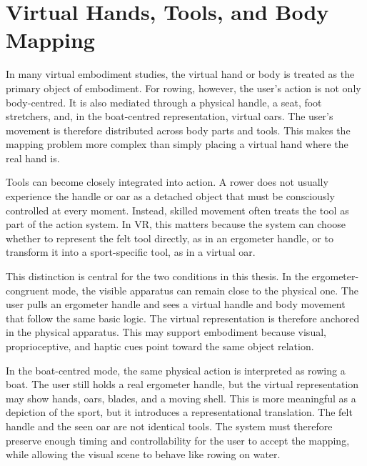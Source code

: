 \section{Virtual Hands, Tools, and Body Mapping}
\label{sec:background_virtual_hands_tools_body_mapping}

In many virtual embodiment studies, the virtual hand or body is treated as the primary object of embodiment. For rowing, however, the user's action is not only body-centred. It is also mediated through a physical handle, a seat, foot stretchers, and, in the boat-centred representation, virtual oars. The user's movement is therefore distributed across body parts and tools. This makes the mapping problem more complex than simply placing a virtual hand where the real hand is.

Tools can become closely integrated into action. A rower does not usually experience the handle or oar as a detached object that must be consciously controlled at every moment. Instead, skilled movement often treats the tool as part of the action system. In VR, this matters because the system can choose whether to represent the felt tool directly, as in an ergometer handle, or to transform it into a sport-specific tool, as in a virtual oar.

This distinction is central for the two conditions in this thesis. In the ergometer-congruent mode, the visible apparatus can remain close to the physical one. The user pulls an ergometer handle and sees a virtual handle and body movement that follow the same basic logic. The virtual representation is therefore anchored in the physical apparatus. This may support embodiment because visual, proprioceptive, and haptic cues point toward the same object relation.

In the boat-centred mode, the same physical action is interpreted as rowing a boat. The user still holds a real ergometer handle, but the virtual representation may show hands, oars, blades, and a moving shell. This is more meaningful as a depiction of the sport, but it introduces a representational translation. The felt handle and the seen oar are not identical tools. The system must therefore preserve enough timing and controllability for the user to accept the mapping, while allowing the visual scene to behave like rowing on water.

